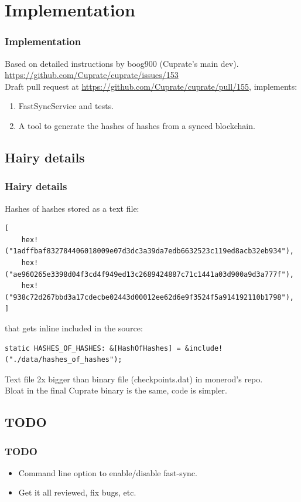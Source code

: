 \documentclass[aspectratio=169]{beamer}
\begin{document}
\section{Implementation}
\begin{frame}[fragile]
  \frametitle{Implementation}
  Based on detailed instructions by boog900 (Cuprate's main dev).\\
  \url{https://github.com/Cuprate/cuprate/issues/153}\\
  \vspace{2\baselineskip}
  Draft pull request at \url{https://github.com/Cuprate/cuprate/pull/155}, implements:
  \begin{enumerate}
    \item FastSyncService and tests.\\
    \item A tool to generate the hashes of hashes from a synced blockchain.
  \end{enumerate}
\end{frame}

\subsection{Hairy details}
\begin{frame}[fragile]
  \frametitle{Hairy details}
  Hashes of hashes stored as a text file:
  \lstset{
    basicstyle=\tiny\ttfamily,
  }
  \begin{lstlisting}
[
	hex!("1adffbaf832784406018009e07d3dc3a39da7edb6632523c119ed8acb32eb934"),
	hex!("ae960265e3398d04f3cd4f949ed13c2689424887c71c1441a03d900a9d3a777f"),
	hex!("938c72d267bbd3a17cdecbe02443d00012ee62d6e9f3524f5a914192110b1798"),
]
  \end{lstlisting}
  that gets inline included in the source:
  \begin{lstlisting}
static HASHES_OF_HASHES: &[HashOfHashes] = &include!("./data/hashes_of_hashes");
  \end{lstlisting}
  Text file 2x bigger than binary file (checkpoints.dat) in monerod's repo.\\
  Bloat in the final Cuprate binary is the same, code is simpler.
\end{frame}

\subsection{TODO}
\begin{frame}[fragile]
  \frametitle{TODO}
  \begin{itemize}
    \item Command line option to enable/disable fast-sync.
    \item Get it all reviewed, fix bugs, etc.
  \end{itemize}
\end{frame}
\end{document}
